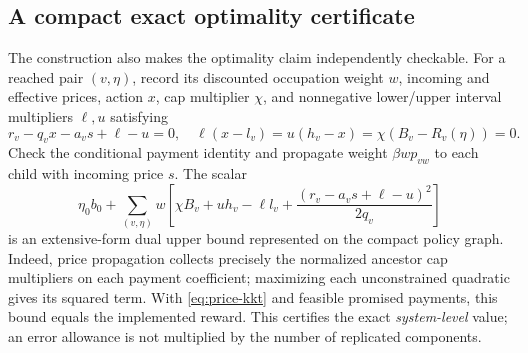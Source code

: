 \subsection{A compact exact optimality certificate}\label{sec:price-certificate}
The construction also makes the optimality claim independently checkable. For a reached pair $(v,\eta)$, record its discounted occupation weight $w$, incoming and effective prices, action $x$, cap multiplier $\chi$, and nonnegative lower/upper interval multipliers $\ell,u$ satisfying
\begin{equation}\label{eq:price-kkt}
 r_v-q_vx-a_vs+\ell-u=0,\quad
 \ell(x-l_v)=u(h_v-x)=\chi(B_v-R_v(\eta))=0.
\end{equation}
Check the conditional payment identity and propagate weight $\beta wp_{vw}$ to each child with incoming price $s$. The scalar
\begin{equation}\label{eq:price-dual}
 \eta_0b_0+\sum_{(v,\eta)}w\left[
 \chi B_v+u h_v-\ell l_v+
 \frac{(r_v-a_vs+\ell-u)^2}{2q_v}\right]
\end{equation}
is an extensive-form dual upper bound represented on the compact policy graph. Indeed, price propagation collects precisely the normalized ancestor cap multipliers on each payment coefficient; maximizing each unconstrained quadratic gives its squared term. With \eqref{eq:price-kkt} and feasible promised payments, this bound equals the implemented reward. This certifies the exact \emph{system-level} value; an error allowance is not multiplied by the number of replicated components.
